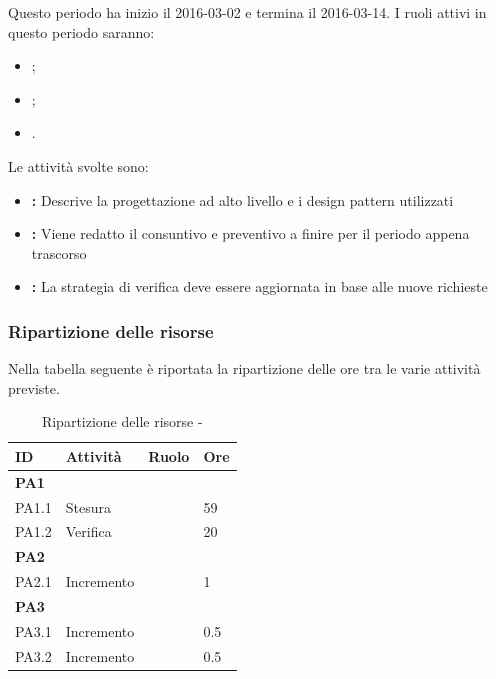 \documentclass[12pt,a4paper]{article}
\begin{document}
Questo periodo ha inizio il 2016-03-02 e termina il 2016-03-14. 
I ruoli attivi in questo periodo saranno:

\begin{itemize}
	\item \PG{};
    \item \RE{};
	\item \VR{}.
\end{itemize}

Le attività svolte sono:

\begin{itemize}
	\item \textbf{\ST{}:} Descrive la progettazione ad alto livello e i design pattern utilizzati
	\item \textbf{\PdP{}:} Viene redatto il consuntivo e preventivo a finire per il periodo appena trascorso
	\item \textbf{\PdQ{}:} La strategia di verifica deve essere aggiornata in base alle nuove richieste
\end{itemize}

\subsubsection{Ripartizione delle risorse}
Nella tabella seguente è riportata la ripartizione delle ore tra le varie attività previste.

\begin{table}[H]
	\begin{center}
		\begin{tabular}{p{} p{} p{} p{}}
			\toprule
			\textbf{ID}	& \textbf{Attività}	& \textbf{Ruolo} & \textbf{Ore}\\ \midrule
			\midrule
			\textbf{PA1} & \textbf{\ST{}} & &  \\ \midrule
			PA1.1 & Stesura & \PG{} & 59 \\ \midrule
			PA1.2 & Verifica & \VR{} & 20 \\ \midrule
            \textbf{PA2} & \textbf{\PdP{}} & &  \\ \midrule
			PA2.1 & Incremento & \RE{} & 1 \\ \midrule
	        \textbf{PA3} & \textbf{\PdQ{}} & &  \\ \midrule
	        PA3.1 & Incremento & \RE{} & 0.5 \\ \midrule
	        PA3.2 & Incremento & \RE{} & 0.5 \\ \midrule
			\bottomrule
		\end{tabular}
		\caption{Ripartizione delle risorse - \FPA{}}
	\end{center}
\end{table}
\end{document}
